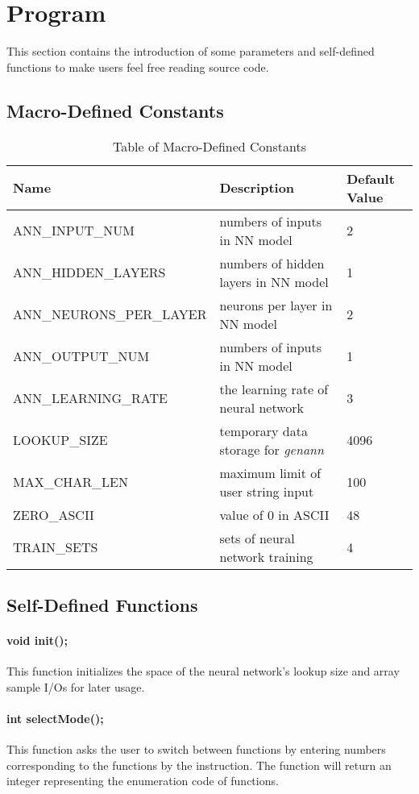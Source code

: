 	\section{Program}
	This section contains the introduction of some parameters and self-defined functions to make users feel free reading source code. 
	\subsection{Macro-Defined Constants}
	\begin{table}[ht]
	    \centering
	    \begin{tabular}{|l|l|l|}
	    \hline
	        Name  &  Description & Default Value\\
	         \hline
    	     ANN\_INPUT\_NUM &  numbers of inputs in NN model &2\\ 
    	     ANN\_HIDDEN\_LAYERS & numbers of hidden layers in NN  model &1\\ 
    	     ANN\_NEURONS\_PER\_LAYER &  neurons per layer in NN model &2\\ 
    	     ANN\_OUTPUT\_NUM & numbers of inputs in NN model &1\\ 
    	     ANN\_LEARNING\_RATE & the learning rate of neural network &3\\ 
    	     LOOKUP\_SIZE & temporary data storage for \textit{genann}  &4096\\ 
    	     MAX\_CHAR\_LEN & maximum limit of user string input &100\\ 
    	     ZERO\_ASCII & value of 0 in ASCII &48\\ 
    	     TRAIN\_SETS & sets of neural network training
    	     &4\\ 
    	      \hline
	    \end{tabular}
	    \caption{Table of Macro-Defined Constants}
	    \label{tab:my_label}
	\end{table}
	\subsection{Self-Defined Functions}
	\paragraph{void init();\\}
	This function initializes the space of the neural network's lookup size and array sample I/Os for later usage. 
	\paragraph{int selectMode();\\}
	This function asks the user to switch between functions by entering numbers corresponding to the functions by the instruction.
	The function will return an integer representing the enumeration code of functions.   

